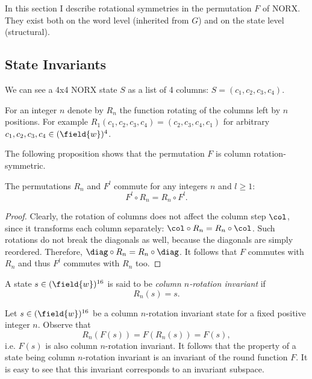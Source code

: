 
In this section I describe rotational symmetries in the permutation $F$ of NORX. They exist both on the word level (inherited from $G$) and on the state level (structural).

\subsection{State Invariants}

We can see a 4x4 NORX state $S$ as a list of 4 columns: $S = (c_1, c_2, c_3, c_4)$. 

\begin{definition}
For an integer $n$ denote by $R_n$ the function rotating of the columns left by $n$ positions. For example $R_1(c_1, c_2, c_3, c_4) = (c_2, c_3, c_4, c_1)$ for arbitrary $c_1, c_2, c_3, c_4 \in (\field{w})^4$.
\end{definition}

The following proposition shows that the permutation $F$ is column rotation-symmetric.

\begin{proposition}
The permutations $R_n$ and $F^l$ commute for any integers $n$ and $l \ge 1$:
$$
F^l \circ R_n = R_n \circ F^l.
$$
\end{proposition}
\begin{proof}
Clearly, the rotation of columns does not affect the column step $\col$, since it transforms each column separately: $\col \circ R_n = R_n \circ \col$. Such rotations do not break the diagonals as well, because the diagonals are simply reordered. Therefore, $\diag \circ R_n = R_n \circ \diag$. It follows that $F$ commutes with $R_n$ and thus $F^l$ commutes with $R_n$ too.
\end{proof}

\begin{definition}
A state $s \in (\field{w})^{16}$ is said to be \emph{column $n$-rotation invariant} if
$$
R_n(s) = s.
$$
\end{definition}

Let $s \in (\field{w})^{16}$ be a column $n$-rotation invariant state for a fixed positive integer $n$. Observe that
$$
R_n(F(s)) = F(R_n(s)) = F(s),
$$
i.e. $F(s)$ is also column $n$-rotation invariant. It follows that the property of a state being column $n$-rotation invariant is an invariant of the round function $F$. It is easy to see that this invariant corresponds to an invariant subspace.

